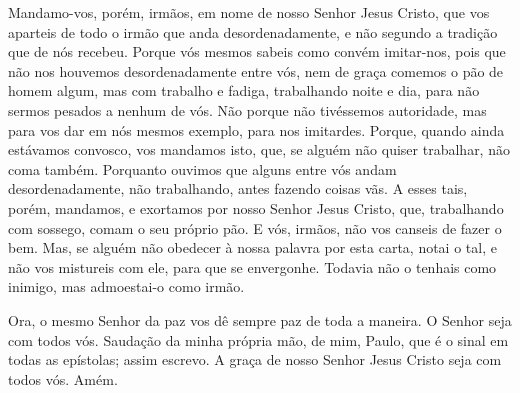 Mandamo-vos, porém, irmãos, em nome de nosso Senhor Jesus Cristo,
que vos aparteis de todo o irmão que anda desordenadamente, e não
segundo a tradição que de nós recebeu. Porque vós mesmos sabeis
como convém imitar-nos, pois que não nos houvemos desordenadamente
entre vós, nem de graça comemos o pão de homem algum, mas com
trabalho e fadiga, trabalhando noite e dia, para não sermos pesados
a nenhum de vós. Não porque não tivéssemos autoridade, mas para
vos dar em nós mesmos exemplo, para nos imitardes. Porque,
quando ainda estávamos convosco, vos mandamos isto, que, se alguém
não quiser trabalhar, não coma também. Porquanto ouvimos que
alguns entre vós andam desordenadamente, não trabalhando, antes
fazendo coisas vãs. A esses tais, porém, mandamos, e
exortamos por nosso Senhor Jesus Cristo, que, trabalhando com
sossego, comam o seu próprio pão. E vós, irmãos, não vos
canseis de fazer o bem. Mas, se alguém não obedecer à nossa
palavra por esta carta, notai o tal, e não vos mistureis com ele,
para que se envergonhe. Todavia não o tenhais como inimigo,
mas admoestai-o como irmão.

Ora, o mesmo Senhor da paz vos dê sempre paz de toda a maneira. O
Senhor seja com todos vós. Saudação da minha própria mão, de
mim, Paulo, que é o sinal em todas as epístolas; assim escrevo.
A graça de nosso Senhor Jesus Cristo seja com todos vós.
Amém.

